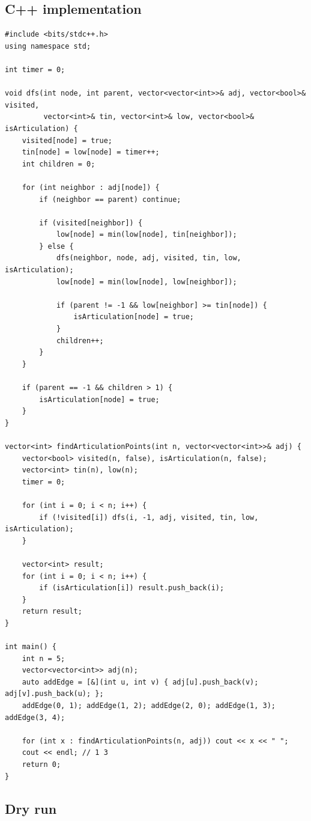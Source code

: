 \subsection*{C++ implementation}

\begin{lstlisting}
#include <bits/stdc++.h>
using namespace std;

int timer = 0;

void dfs(int node, int parent, vector<vector<int>>& adj, vector<bool>& visited,
         vector<int>& tin, vector<int>& low, vector<bool>& isArticulation) {
    visited[node] = true;
    tin[node] = low[node] = timer++;
    int children = 0;

    for (int neighbor : adj[node]) {
        if (neighbor == parent) continue;

        if (visited[neighbor]) {
            low[node] = min(low[node], tin[neighbor]);
        } else {
            dfs(neighbor, node, adj, visited, tin, low, isArticulation);
            low[node] = min(low[node], low[neighbor]);

            if (parent != -1 && low[neighbor] >= tin[node]) {
                isArticulation[node] = true;
            }
            children++;
        }
    }

    if (parent == -1 && children > 1) {
        isArticulation[node] = true;
    }
}

vector<int> findArticulationPoints(int n, vector<vector<int>>& adj) {
    vector<bool> visited(n, false), isArticulation(n, false);
    vector<int> tin(n), low(n);
    timer = 0;

    for (int i = 0; i < n; i++) {
        if (!visited[i]) dfs(i, -1, adj, visited, tin, low, isArticulation);
    }

    vector<int> result;
    for (int i = 0; i < n; i++) {
        if (isArticulation[i]) result.push_back(i);
    }
    return result;
}

int main() {
    int n = 5;
    vector<vector<int>> adj(n);
    auto addEdge = [&](int u, int v) { adj[u].push_back(v); adj[v].push_back(u); };
    addEdge(0, 1); addEdge(1, 2); addEdge(2, 0); addEdge(1, 3); addEdge(3, 4);

    for (int x : findArticulationPoints(n, adj)) cout << x << " ";
    cout << endl; // 1 3
    return 0;
}
\end{lstlisting}

\subsection*{Dry run}

